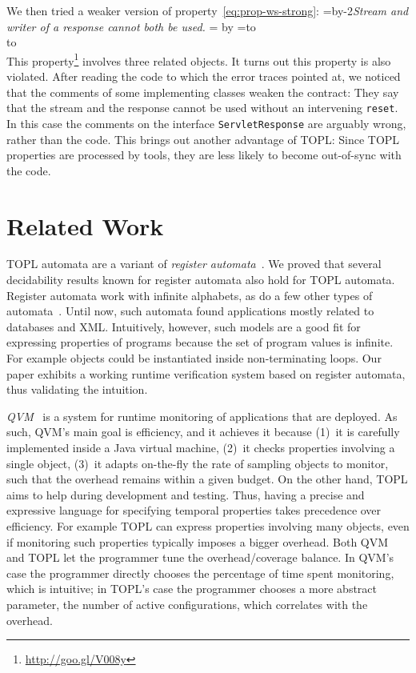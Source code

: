 \documentclass{article} %
\newcommand{\quoteindent}{1.5\parindent} %
\newcommand{\eqquote}[2]{{%
  \refstepcounter{equation}\label{#2}%
  \newdimen\qi\qi=\quoteindent
  \setbox0=\vbox{\advance\hsize by-2\qi\noindent\em#1}%
  \newdimen\x\x=\ht0 \advance\x by\dp0%
  \setbox1=\vbox to\x{\vss\hbox{(\arabic{equation})}\vss}%
  \leavevmode\\[1ex]%
  \hbox to\hsize{\hskip\qi\box0\hfil\box1}%
  \\[1ex]}}
\theoremstyle{definition}
\theoremstyle{remark}
\begin{document}
We then tried a weaker version of property~\eqref{eq:prop-ws-strong}:
\eqquote{Stream and writer of a response cannot both be used.}
{eq:prop-ws-weak}
This property\footnote{\url{http://goo.gl/V008y}} involves three related objects.
It turns out this property is also violated.
After reading the code to which the error traces pointed at, we noticed that the comments of some implementing classes weaken the contract:
They say that the stream and the response cannot be used without an intervening {\tt reset}.
In this case the comments on the interface {\tt ServletResponse} are arguably wrong, rather than the code.
This brings out another advantage of TOPL:
Since TOPL properties are processed by tools, they are less likely to become out-of-sync with the code.

\section{Related Work}\label{sec:related} %

TOPL automata are a variant of {\it register automata\/}~\cite{dblp:conf/focs/kaminskif90}.
We proved that several decidability results known for register automata also hold for TOPL automata.
Register automata work with infinite alphabets, as do a few other types of automata~\cite{dblp:conf/csl/segoufin06}.
Until now, such automata found applications mostly related to databases and XML\null.
Intuitively, however, such models are a good fit for expressing properties of programs because the set of program values is infinite.
For example objects could be instantiated inside non-terminating loops.
Our paper exhibits a working runtime verification system based on register automata, thus validating the intuition.

{\it QVM\/}~\cite{arnold:2008} is a system for runtime monitoring of applications that are deployed.
As such, QVM's main goal is efficiency, and it achieves it because
(1)~it is carefully implemented inside a Java virtual machine,
(2)~it checks properties involving a single object,
(3)~it adapts on-the-fly the rate of sampling objects to monitor, such that the overhead remains within a given budget.
On the other hand, TOPL aims to help during development and testing.
Thus, having a precise and expressive language for specifying temporal properties takes precedence over efficiency.
For example TOPL can express properties involving many objects, even if monitoring such properties typically imposes a bigger overhead.
Both QVM and TOPL let the programmer tune the overhead\slash coverage balance.
In QVM's case the programmer directly chooses the percentage of time spent monitoring, which is intuitive;
in TOPL's case the programmer chooses a more abstract parameter, the number of active configurations, which correlates with the overhead.
\end{document}
